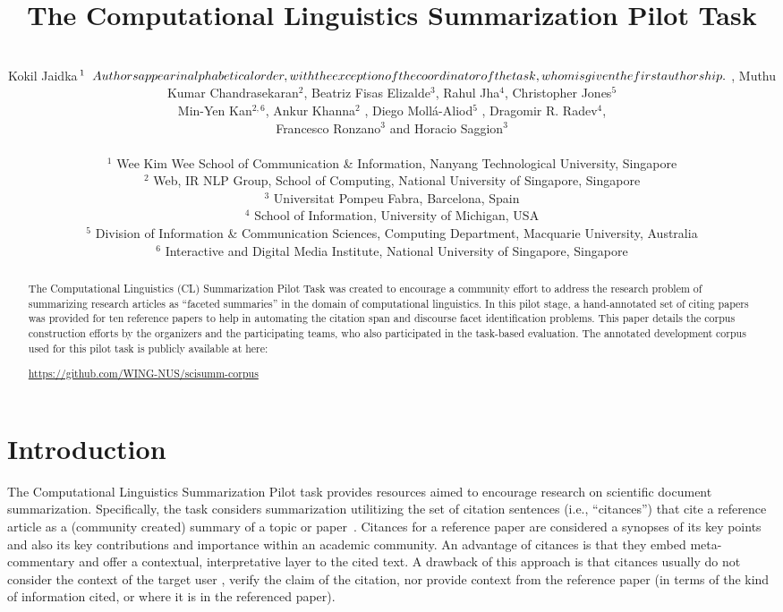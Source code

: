 \documentclass[11pt]{article}
\title{The Computational Linguistics Summarization Pilot Task}
\author{\\Kokil Jaidka$^{1}\relax{\hspace{.2cm}Authors appear in alphabetical order, with the exception of the coordinator of the task, whom is given the first authorship.} $ , Muthu Kumar Chandrasekaran$^{2}$, Beatriz Fisas Elizalde$^{3}$, Rahul Jha$^{4}$, Christopher Jones$^{5}$ \\ { Min-Yen Kan}$^{2,6}${, Ankur Khanna}$^{2}${ , Diego Moll\'{a}-Aliod}$^{5}${ , Dragomir R. Radev}$^{4}$, \\ { Francesco Ronzano}$^{3}$ and { Horacio Saggion}$^{3}$ \\ 
\\
$^1$ Wee Kim Wee School of Communication \& Information, Nanyang Technological University, Singapore \\
$^2$ Web, IR \/ NLP Group, School of Computing, National University of Singapore, Singapore \\
$^3$ Universitat Pompeu Fabra, Barcelona, Spain\\
$^4$ School of Information, University of Michigan, USA\\
$^5$ Division of Information \& Communication Sciences, Computing Department, Macquarie University, Australia \\
$^6$ Interactive and Digital Media Institute, National University of Singapore, Singapore}
\begin{document}
\maketitle
\begin{abstract}
The Computational Linguistics (CL) Summarization Pilot Task was created to encourage a community effort to address the research problem of summarizing research articles as ``faceted summaries'' in the domain of computational linguistics. In this pilot stage, a hand-annotated set of citing papers was provided for ten reference papers to help in automating the citation span and discourse facet identification problems.  This paper details the corpus construction efforts by the organizers and the participating teams, who also participated in the task-based evaluation. The annotated development corpus used for this pilot task is publicly available at
here: \begin{sloppypar}
\url{https://github.com/WING-NUS/scisumm-corpus}
\end{sloppypar}
\end{abstract}
\section{Introduction}

The Computational Linguistics Summarization Pilot task provides
resources aimed to encourage research on
scientific document summarization.  Specifically, the task considers
summarization utilitizing the set of citation sentences (i.e.,
``citances'') that cite a reference article as a (community created)
summary of a topic or
paper~\cite{nanba2011classification,qazvinian2010identifying}. Citances
for a reference paper are considered a synopses of its key points and
also its key contributions and importance within an academic
community. An advantage of citances is that they embed meta-commentary
and offer a contextual, interpretative layer to the cited text. A
drawback of this approach is that citances usually do not consider the
context of the target user
\cite{jones2007automatic,teufel2002summarizing}, verify the claim of
the citation, nor provide context from the reference paper (in terms of
the kind of information cited, or where it is in the referenced
paper).
\end{document}
